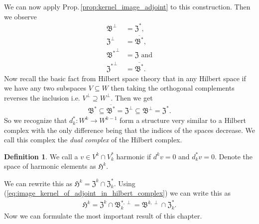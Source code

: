 \documentclass[12pt,a4paper]{article}
\numberwithin{equation}{subsection}
\numberwithin{lemma}{subsection}
\theoremstyle{definition}
\newtheorem{definition}[lemma]{Definition}
\begin{document}
We can now apply Prop.\,\ref{prop:kernel_image_adjoint} to this construction. 
Then we observe 
\begin{align*}
    \mathfrak{B}^\perp &= \mathfrak{Z}^*,
    \\ \mathfrak{Z}^\perp &= \overline{\mathfrak{B}^*},
    \\ \mathfrak{B^*}^\perp &= \mathfrak{Z} \text{ and}
    \\ \mathfrak{Z^*}^\perp &= \overline{\mathfrak{B}^*}.
\end{align*}
Now recall the basic fact from Hilbert space theory that 
in any Hilbert space if we have any two subspaces $V \subseteq W$ then taking the 
orthogonal complements reverses the inclusion i.e.
$V^\perp \supseteq W^\perp$. Then we get 
\begin{align}
    \mathfrak{B}^* \subseteq \overline{\mathfrak{B}^*} 
    = \mathfrak{Z}^\perp  \subseteq \mathfrak{B}^\perp 
    = \mathfrak{Z}^*. \label{eq:image_kernel_of_adjoint_in_hilbert_complex}
\end{align}
So we recognize that $d_k^*:W^k \rightarrow W^{k-1}$ form a structure 
very similar to a Hilbert complex with the only difference being that 
the indices of the spaces decrease. We call this complex the 
\textit{dual complex} of the Hilbert complex.

\begin{definition}
    We call a $v \in V^k \cap V^*_k$ harmonic if $d^k v = 0$ and 
    $d^*_k v = 0$. Denote the space of harmonic elements as 
    $\mathfrak{H}^k$.
\end{definition}
\noindent We can rewrite this as $\mathfrak{H}^k = \mathfrak{Z}^k 
\cap \mathfrak{Z}^*_k$. Using 
(\ref{eq:image_kernel_of_adjoint_in_hilbert_complex}) we can write this as
\begin{align*}
    \mathfrak{H}^k = \mathfrak{Z}^k \cap \mathfrak{B}^{*,\perp}_k
         = \mathfrak{B}^{k,\perp} \cap \mathfrak{Z}^*_k.
\end{align*}
Now we can formulate the most important 
result of this chapter. 
\end{document}
